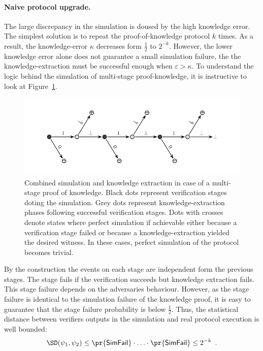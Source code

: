 \documentclass{crypto-exercise}
\newcommand{\SFAIL}{\mathsf{SimFail}}
\begin{document}
\begin{solution}
\paragraph{Naive protocol upgrade.}
The large discrepancy in the simulation is doused by the high knowledge error. The simplest solution is to repeat the proof-of-knowledge protocol $k$ times. As a result, the knowledge-error $\kappa$ decreases form $\frac{1}{2}$ to $2^{-k}$. However, the lower knowledge error alone does not guarantee a small simulation failure, the the knowledge-extraction must be successful enough when $\varepsilon>\kappa$. To understand the logic behind the simulation of multi-stage proof-knowledge, it is instructive to look at Figure~\ref{fig:proof-event-tree}.  

\begin{figure}[!h]
   \centering
   \includegraphics[scale=0.85]{figures/1102-event-tree-ii}
   \caption{Combined simulation and knowledge extraction in case of a multi-stage proof of knowledge. Black dots represent verification stages doting the simulation. Grey dots represent knowledge-extraction phases following successful verification stages. Dots with crosses denote states where perfect simulation if achievable either because a verification stage failed or because a knowledge-extraction yielded the desired witness. In these cases, perfect simulation of the protocol becomes trivial.}
   \label{fig:proof-event-tree}
\end{figure}

By the construction the events on each stage are independent form the previous stages. The
stage fails if the verification succeeds but knowledge extraction fails. This stage failure depends on the adversaries behaviour. However, as the stage failure is identical to the simulation failure of  the knowledge proof, it is easy to guarantee that the stage failure probability is below $\frac{1}{2}$. Thus, the statistical distance between verifiers outputs in the simulation and real protocol execution is well bounded:
\begin{align*}
\SD(\psi_1,\psi_2)\leq \pr{\SFAIL}\cdot\ldots\cdot\pr{\SFAIL} \leq 2^{-k}\enspace.
\end{align*}        


\end{solution}
\end{document}

